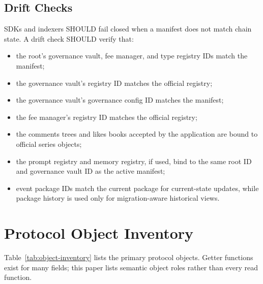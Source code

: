 \documentclass[11pt]{article}
\begin{document}
\subsection{Drift Checks}

SDKs and indexers SHOULD fail closed when a manifest does not match chain state. A drift check SHOULD verify that:

\begin{itemize}[leftmargin=*]
  \item the root's governance vault, fee manager, and type registry IDs match the manifest;
  \item the governance vault's registry ID matches the official registry;
  \item the governance vault's governance config ID matches the manifest;
  \item the fee manager's registry ID matches the official registry;
  \item the comments trees and likes books accepted by the application are bound to official series objects;
  \item the prompt registry and memory registry, if used, bind to the same root ID and governance vault ID as the active manifest;
  \item event package IDs match the current package for current-state updates, while package history is used only for migration-aware historical views.
\end{itemize}

\section{Protocol Object Inventory}

Table~\ref{tab:object-inventory} lists the primary protocol objects. Getter functions exist for many fields; this paper lists semantic object roles rather than every read function.
\end{document}
